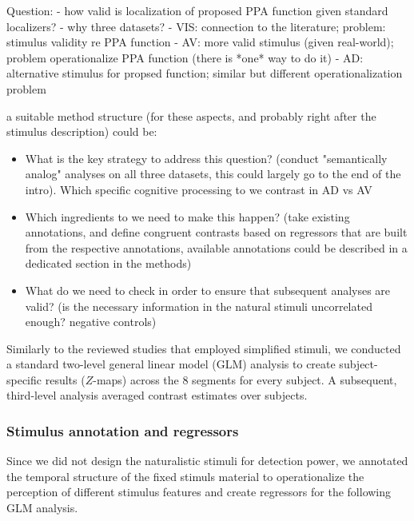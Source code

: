 \documentclass[english]{article}
\begin{document}
Question:
- how valid is localization of proposed PPA function given standard localizers?
- why three datasets?
  - VIS: connection to the literature; problem: stimulus validity re PPA function
  - AV: more valid stimulus (given real-world); problem operationalize PPA function (there is *one* way to do it)
  - AD: alternative stimulus for propsed function; similar but different operationalization problem

a suitable method structure (for these aspects, and probably right after the stimulus description) could be:
\begin{itemize}
  \item What is the key strategy to address this question? (conduct "semantically analog" analyses on all three datasets, this could largely go to the end of the intro). Which specific cognitive processing to we contrast in AD vs AV
  \item Which ingredients to we need to make this happen? (take existing annotations, and define congruent contrasts based
    on regressors that are built from the respective annotations, available annotations could be described in a dedicated section in the methods)
  \item What do we need to check in order to ensure that subsequent analyses are valid? (is the necessary information in the natural stimuli uncorrelated enough? negative controls)
\end{itemize}

Similarly to the reviewed studies that employed simplified stimuli, we conducted
a standard two-level general linear model (GLM) analysis to create
subject-specific results ($Z$-maps) across the 8 segments for every subject. A
subsequent, third-level analysis averaged contrast estimates over subjects.


\subsubsection{Stimulus annotation and regressors}



Since we did not design the naturalistic stimuli for detection power, we
annotated the temporal structure of the fixed stimuls material to operationalize
the perception of different stimulus features and create regressors for the
following GLM analysis.
\end{document}
